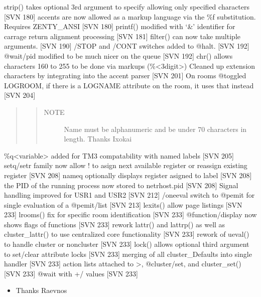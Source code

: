 \documentclass[letterpaper,10pt,english]{sphinxmanual}
\begin{document}
\sphinxAtStartPar
strip() takes optional 3rd argument to specify allowing only specified characters {[}SVN 180{]}
accents are now allowed as a markup language via the \%f substitution.  Requires ZENTY\_ANSI {[}SVN 180{]}
printf() modified with ‘\&’ identifier for carrage return alignment processing {[}SVN 181{]}
filter() can now take multiple arguments. {[}SVN 190{]}
/STOP and /CONT switches added to @halt.  {[}SVN 192{]}
@wait/pid modified to be much nicer on the queue {[}SVN 192{]}
chr() allows characters 160 to 255 to be done via markups (\%\textless{}3digit\textgreater{})
Cleaned up extension characters by integrating into the accent parser {[}SVN 201{]}
On rooms @toggled LOGROOM, if there is a LOGNAME attribute on the room, it uses that instead {[}SVN 204{]}
\begin{quote}
\begin{quote}\begin{description}
\item[{NOTE}] \leavevmode
\sphinxAtStartPar
Name must be alphanumeric and be under 70 characters in length.
\sphinxhyphen{} Thanks Ixokai

\end{description}\end{quote}
\end{quote}

\sphinxAtStartPar
\%q\textless{}variable\textgreater{} added for TM3 compatability with named labels {[}SVN 205{]}
setq/setr family now allow ! to asign next available register or re\sphinxhyphen{}assign existing register {[}SVN 208{]}
nameq optionally displays register asigned to label {[}SVN 208{]}
the PID of the running process now stored to netrhost.pid {[}SVN 208{]}
Signal handling improved for USR1 and USR2 {[}SVN 212{]}
/oneeval switch to @pemit for single evaluation of a @pemit/list {[}SVN 213{]}
lexits() allow page listings {[}SVN 233{]}
lrooms() \sphinxhyphen{} fix for specific room identification {[}SVN 233{]}
@function/display now shows flags of functions {[}SVN 233{]}
rework lattr() and lattrp() as well as cluster\_lattr() to use centralized core functionality {[}SVN 233{]}
rework of ueval() to handle cluster or non\sphinxhyphen{}cluster {[}SVN 233{]}
lock() allows optional third argument to set/clear attribute locks {[}SVN 233{]}
merging of all cluster\_Defaults into single handler {[}SVN 233{]}
action lists attached to \textgreater{}, @cluster/set, and cluster\_set() {[}SVN 233{]}
@wait with +/\sphinxhyphen{} values {[}SVN 233{]}
\begin{itemize}
\item {} 
\sphinxAtStartPar
Thanks Raevnos

\end{itemize}
\end{document}
